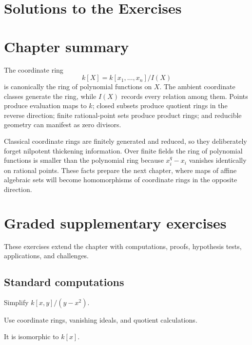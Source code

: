 \ifdefined\IncludeExerciseSolutions
\section{Solutions to the Exercises}
\label{sec:vi03-exercise-solutions}

\fi

\section{Chapter summary}
\label{sec:vi03-summary}

The coordinate ring
\[
k[X]=k[x_1,\dots,x_n]/I(X)
\]
is canonically the ring of polynomial functions on \(X\).  The ambient coordinate classes
generate the ring, while \(I(X)\) records every relation among them.  Points produce
evaluation maps to \(k\); closed subsets produce quotient rings in the reverse direction;
finite rational-point sets produce product rings; and reducible geometry can manifest as
zero divisors.

Classical coordinate rings are finitely generated and reduced, so they deliberately forget
nilpotent thickening information.  Over finite fields the ring of polynomial functions is
smaller than the polynomial ring because \(x_i^q-x_i\) vanishes identically on rational
points.  These facts prepare the next chapter, where maps of affine algebraic sets will
become homomorphisms of coordinate rings in the opposite direction.
\section{Graded supplementary exercises}
These exercises extend the chapter with computations, proofs, hypothesis tests, applications, and challenges.

\subsection*{Standard computations}

\begin{exercise}\label{exr:vi03-expand-01}
Simplify $k[x,y]/(y-x^2)$.
\end{exercise}
\begin{hint}
Use coordinate rings, vanishing ideals, and quotient calculations.
\end{hint}
\begin{solution}
It is isomorphic to $k[x]$.
\end{solution}

